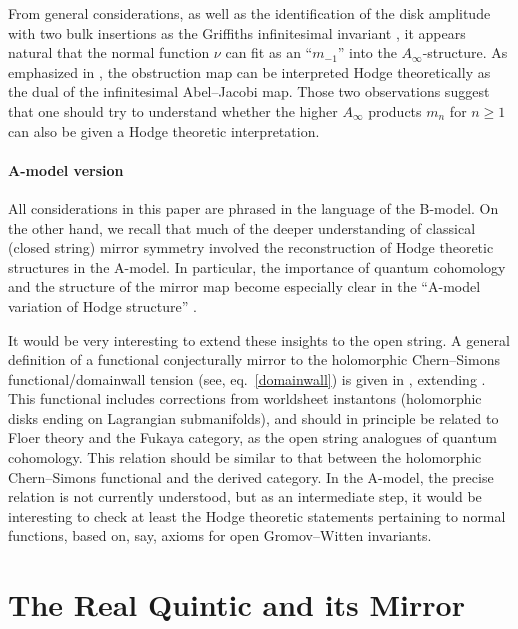 From general considerations, as well as the identification of the disk 
amplitude with two bulk insertions as the Griffiths infinitesimal invariant 
\cite{extended}, it appears natural that the normal function $\nu$ can 
fit as an ``$m_{-1}$'' into the $A_\infty$-structure.
As emphasized in \cite{extended}, the obstruction map can be interpreted
Hodge theoretically as the dual of the infinitesimal Abel--Jacobi map.
Those two observations suggest that one should try to understand
whether the higher $A_\infty$ products $m_n$ for $n\ge 1$ can also 
be given a Hodge theoretic interpretation.


\paragraph{A-model version}

All considerations in this paper are phrased in the language of the
B-model. On the other hand, we recall that much of the deeper
understanding of classical (closed string) mirror symmetry involved
the reconstruction of Hodge theoretic structures in the A-model.
In particular, the importance of quantum cohomology and the 
structure of the mirror map become especially clear in the ``A-model 
variation of Hodge structure'' \cite{compact,parkcity}.

It would be very interesting to extend these insights to
the open string. A general definition of a functional conjecturally 
mirror to the holomorphic Chern--Simons functional/domainwall tension 
(see, eq.\ \eqref{domainwall}) is given in \cite{psw}, extending 
\cite{wcs}. This functional includes corrections from worldsheet 
instantons (holomorphic disks ending on Lagrangian submanifolds), 
and should in principle be related to Floer theory and the Fukaya 
category, as the open string analogues of quantum cohomology. 
This relation should be similar to that between the holomorphic Chern--Simons 
functional and the derived category. In the A-model, the precise relation 
is not currently understood, but as an intermediate step, it would 
be interesting to check at least the Hodge theoretic statements 
pertaining to normal functions, based on, say, axioms for open 
Gromov--Witten invariants.


\section{The Real Quintic and its Mirror}
\label{realquintic}


